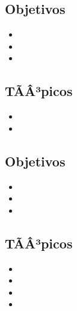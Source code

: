 \subsection*{Objetivos}
\begin{itemize}
	\item \ALNUEVEObjUNO
	\item \ALNUEVEObjDOS
	\item \ALNUEVEObjTRES
\end{itemize}

\subsection{\ALDIEZDef}\label{sec:BOK-AL10}

\subsection*{TÃÂ³picos}
\begin{itemize}
	\item \ALDIEZTopicSegmentos
	\item \ALDIEZTopicAlgoritmos
\end{itemize}

\subsection*{Objetivos}
\begin{itemize}
	\item \ALDIEZObjUNO
	\item \ALDIEZObjDOS
	\item \ALDIEZObjTRES
\end{itemize}

\subsection{\ALONCEDef}\label{sec:BOK-AL11}

\subsection*{TÃÂ³picos}
\begin{itemize}
	\item \ALONCETopicEl
	\item \ALONCETopicLecturas
	\item \ALONCETopicSalto
	\item \ALONCETopicElteorema
\end{itemize}

